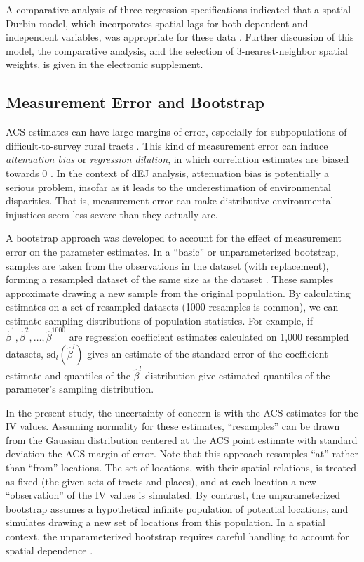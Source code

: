 \documentclass[ijerph,article,submit,oneauthor,pdftex]{Definitions/mdpi}
\begin{document}
A comparative analysis of three regression specifications indicated that a spatial Durbin model, which incorporates spatial lags for both dependent and independent variables, was appropriate for these data \citep{LeSageIntroductionSpatialEconometrics2009}. Further discussion of this model, the comparative analysis, and the selection of 3-nearest-neighbor spatial weights, is given in the electronic supplement.

\hypertarget{measurement-error-and-bootstrap}{%
\subsection{Measurement Error and Bootstrap}\label{measurement-error-and-bootstrap}}

ACS estimates can have large margins of error, especially for subpopulations of difficult-to-survey rural tracts \citep{SpielmanReducingUncertaintyAmerican2015}. This kind of measurement error can induce \emph{attenuation bias} or \emph{regression dilution}, in which correlation estimates are biased towards 0 \citep{FrostCorrectingRegressionDilution2000}. In the context of dEJ analysis, attenuation bias is potentially a serious problem, insofar as it leads to the underestimation of environmental disparities. That is, measurement error can make distributive environmental injustices seem less severe than they actually are.

A bootstrap approach was developed to account for the effect of measurement error on the parameter estimates. In a ``basic'' or unparameterized bootstrap, samples are taken from the observations in the dataset (with replacement), forming a resampled dataset of the same size as the dataset \citep{KulesaPointsSignificanceSampling2015}. These samples approximate drawing a new sample from the original population. By calculating estimates on a set of resampled datasets (1000 resamples is common), we can estimate sampling distributions of population statistics. For example, if \(\hat\beta^1, \hat\beta^2, \ldots, \hat\beta^{1000}\) are regression coefficient estimates calculated on 1,000 resampled datasets, \(\mathrm{sd}_l(\hat\beta^l)\) gives an estimate of the standard error of the coefficient estimate and quantiles of the \(\hat\beta^l\) distribution give estimated quantiles of the parameter's sampling distribution.

In the present study, the uncertainty of concern is with the ACS estimates for the IV values. Assuming normality for these estimates, ``resamples'' can be drawn from the Gaussian distribution centered at the ACS point estimate with standard deviation the ACS margin of error. Note that this approach resamples ``at'' rather than ``from'' locations. The set of locations, with their spatial relations, is treated as fixed (the given sets of tracts and places), and at each location a new ``observation'' of the IV values is simulated. By contrast, the unparameterized bootstrap assumes a hypothetical infinite population of potential locations, and simulates drawing a new set of locations from this population. In a spatial context, the unparameterized bootstrap requires careful handling to account for spatial dependence \citep{AnselinRobustApproachesTesting1990}.
\end{document}
